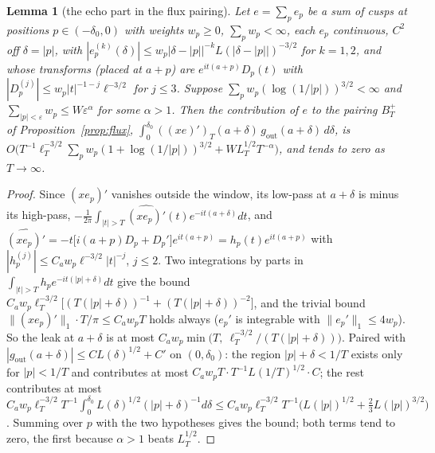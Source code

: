 \documentclass[11pt]{article}
\newtheorem{lemma}[theorem]{Lemma}
\theoremstyle{definition}
\theoremstyle{remark}
\begin{document}
\begin{lemma}[the echo part in the flux pairing]\label{lem:fluxecho}
Let $e=\sum_pe_p$ be a sum of cusps at positions $p\in(-\delta_0,0)$ with weights $w_p\ge0$, $\sum_pw_p<\infty$, each $e_p$ continuous, $C^2$ off $\delta=|p|$, with $|e_p^{(k)}(\delta)|\le w_p|\delta-|p||^{-k}L(|\delta-|p||)^{-3/2}$ for $k=1,2$, and whose transforms (placed at $a+p$) are $e^{it(a+p)}D_p(t)$ with $|D_p^{(j)}|\le w_p|t|^{-1-j}\ell^{-3/2}$ for $j\le3$. Suppose $\sum_pw_p(\log(1/|p|))^{3/2}<\infty$ and $\sum_{|p|<\varepsilon}w_p\le W\varepsilon^{\alpha}$ for some $\alpha>1$. Then the contribution of $e$ to the pairing $B_T^+$ of Proposition~\ref{prop:flux}, $\int_0^{\delta_0}((xe)')_T(a+\delta)\,g_{\mathrm{out}}(a+\delta)\,d\delta$, is $O\big(T^{-1}\ell_T^{-3/2}\sum_pw_p(1+\log(1/|p|))^{3/2}+WL_T^{1/2}T^{-\alpha}\big)$, and tends to zero as $T\to\infty$.
\end{lemma}
\begin{proof}
Since $(xe_p)'$ vanishes outside the window, its low-pass at $a+\delta$ is minus its high-pass, $-\frac1{2\pi}\int_{|t|>T}\widehat{(xe_p)'}(t)e^{-it(a+\delta)}dt$, and $\widehat{(xe_p)'}=-t\big[i(a+p)D_p+D_p'\big]e^{it(a+p)}=h_p(t)e^{it(a+p)}$ with $|h_p^{(j)}|\le C_aw_p\ell^{-3/2}|t|^{-j}$, $j\le2$. Two integrations by parts in $\int_{|t|>T}h_pe^{-it(|p|+\delta)}dt$ give the bound $C_aw_p\ell_T^{-3/2}\big[(T(|p|+\delta))^{-1}+(T(|p|+\delta))^{-2}\big]$, and the trivial bound $\|(xe_p)'\|_1\cdot T/\pi\le C_aw_pT$ holds always ($e_p'$ is integrable with $\|e_p'\|_1\le4w_p$). So the leak at $a+\delta$ is at most $C_aw_p\min\big(T,\ \ell_T^{-3/2}/(T(|p|+\delta))\big)$. Paired with $|g_{\mathrm{out}}(a+\delta)|\le CL(\delta)^{1/2}+C'$ on $(0,\delta_0)$: the region $|p|+\delta<1/T$ exists only for $|p|<1/T$ and contributes at most $C_aw_pT\cdot T^{-1}L(1/T)^{1/2}\cdot C$; the rest contributes at most $C_aw_p\ell_T^{-3/2}T^{-1}\int_0^{\delta_0}L(\delta)^{1/2}(|p|+\delta)^{-1}d\delta\le C_aw_p\ell_T^{-3/2}T^{-1}\big(L(|p|)^{1/2}+\tfrac23L(|p|)^{3/2}\big)$. Summing over $p$ with the two hypotheses gives the bound; both terms tend to zero, the first because $\alpha>1$ beats $L_T^{1/2}$.
\end{proof}
\end{document}
